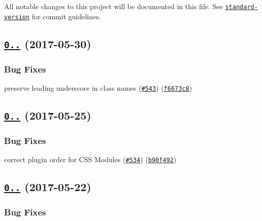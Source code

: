 All notable changes to this project will be documented in this file. See \href{https://github.com/conventional-changelog/standard-version}{\tt standard-\/version} for commit guidelines.

\label{_0.28.4}%
 \subsection*{\href{https://github.com/webpack/css-loader/compare/v0.28.3...v0.28.4}{\tt 0..} (2017-\/05-\/30)}

\subsubsection*{Bug Fixes}


\begin{DoxyItemize}
\item preserve leading underscore in class names (\href{https://github.com/webpack/css-loader/issues/543}{\tt \#543}) (\href{https://github.com/webpack/css-loader/commit/f6673c8}{\tt f6673c8})
\end{DoxyItemize}

\label{_0.28.3}%
 \subsection*{\href{https://github.com/webpack/css-loader/compare/v0.28.2...v0.28.3}{\tt 0..} (2017-\/05-\/25)}

\subsubsection*{Bug Fixes}


\begin{DoxyItemize}
\item correct plugin order for C\+SS Modules (\href{https://github.com/webpack/css-loader/issues/534}{\tt \#534}) (\href{https://github.com/webpack/css-loader/commit/b90f492}{\tt b90f492})
\end{DoxyItemize}

\label{_0.28.2}%
 \subsection*{\href{https://github.com/webpack/css-loader/compare/v0.28.1...v0.28.2}{\tt 0..} (2017-\/05-\/22)}

\subsubsection*{Bug Fixes}


